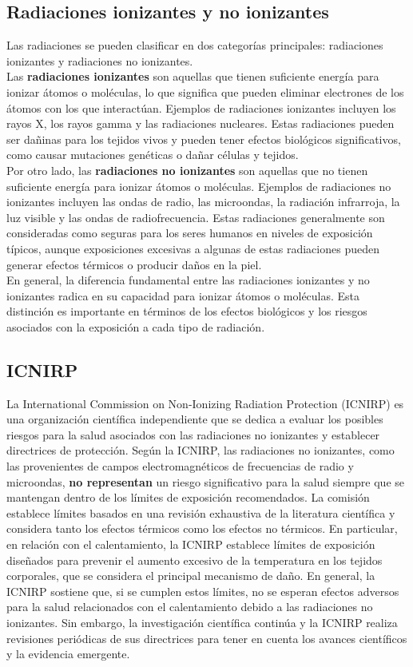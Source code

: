 \documentclass[
	12pt, %
	fleqn, %
	a4paper, %
	oneside, %
]{LegrandOrangeBook}
\begin{document}
\subsection{Radiaciones ionizantes y no ionizantes}
Las radiaciones se pueden clasificar en dos categorías principales: radiaciones ionizantes y radiaciones no ionizantes.\\
Las \textbf{radiaciones ionizantes} son aquellas que tienen suficiente energía para ionizar átomos o moléculas, lo que significa que pueden eliminar electrones de los átomos con los que interactúan. Ejemplos de radiaciones ionizantes incluyen los rayos X, los rayos gamma y las radiaciones nucleares. Estas radiaciones pueden ser dañinas para los tejidos vivos y pueden tener efectos biológicos significativos, como causar mutaciones genéticas o dañar células y tejidos.\\
Por otro lado, las \textbf{radiaciones no ionizantes} son aquellas que no tienen suficiente energía para ionizar átomos o moléculas. Ejemplos de radiaciones no ionizantes incluyen las ondas de radio, las microondas, la radiación infrarroja, la luz visible y las ondas de radiofrecuencia. Estas radiaciones generalmente son consideradas como seguras para los seres humanos en niveles de exposición típicos, aunque exposiciones excesivas a algunas de estas radiaciones pueden generar efectos térmicos o producir daños en la piel.\\
En general, la diferencia fundamental entre las radiaciones ionizantes y no ionizantes radica en su capacidad para ionizar átomos o moléculas. Esta distinción es importante en términos de los efectos biológicos y los riesgos asociados con la exposición a cada tipo de radiación.
\subsection{ICNIRP}
La International Commission on Non-Ionizing Radiation Protection (ICNIRP) es una organización científica independiente que se dedica a evaluar los posibles riesgos para la salud asociados con las radiaciones no ionizantes y establecer directrices de protección. Según la ICNIRP, las radiaciones no ionizantes, como las provenientes de campos electromagnéticos de frecuencias de radio y microondas, \textbf{no representan} un riesgo significativo para la salud siempre que se mantengan dentro de los límites de exposición recomendados. La comisión establece límites basados en una revisión exhaustiva de la literatura científica y considera tanto los efectos térmicos como los efectos no térmicos. En particular, en relación con el calentamiento, la ICNIRP establece límites de exposición diseñados para prevenir el aumento excesivo de la temperatura en los tejidos corporales, que se considera el principal mecanismo de daño. En general, la ICNIRP sostiene que, si se cumplen estos límites, no se esperan efectos adversos para la salud relacionados con el calentamiento debido a las radiaciones no ionizantes. Sin embargo, la investigación científica continúa y la ICNIRP realiza revisiones periódicas de sus directrices para tener en cuenta los avances científicos y la evidencia emergente.
\end{document}

